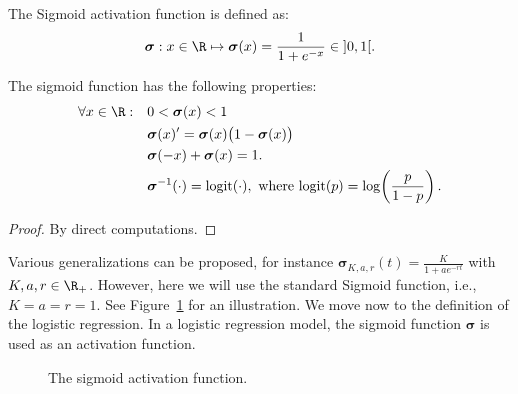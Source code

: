 \begin{definition}
The Sigmoid activation function is defined as:
\begin{equation}\label{eq:ch4-sigmoid-def}
\boldsymbol{\sigma} : x \in \R \mapsto \boldsymbol{\sigma}(x) = \frac{1}{1 + e^{-x}} \in\; ]0, 1[.
\end{equation}
\end{definition}

\begin{lemma}
The sigmoid function has the following properties:
\begin{align}
\forall x \in \R:\quad & 0 < \boldsymbol{\sigma}(x) < 1 \label{eq:ch4-sig-bounds}\\
& \boldsymbol{\sigma}(x)' = \boldsymbol{\sigma}(x)\bigl(1 - \boldsymbol{\sigma}(x)\bigr) \label{eq:ch4-sig-deriv}\\
& \boldsymbol{\sigma}(-x) + \boldsymbol{\sigma}(x) = 1. \label{eq:ch4-sig-sym}\\
& \boldsymbol{\sigma}^{-1}(\cdot) = \mathrm{logit}(\cdot),\ \text{where } \mathrm{logit}(p) = \log\!\left( \frac{p}{1-p} \right). \label{eq:ch4-sig-logit}
\end{align}
\end{lemma}
\begin{proof}
By direct computations.
\end{proof}

Various generalizations can be proposed, for instance $\boldsymbol{\sigma}_{K,a,r}(t) = \frac{K}{1 + a e^{-rt}}$
with $K, a, r \in \R_+$. However, here we will use the standard Sigmoid function,
i.e., $K = a = r = 1$. See Figure~\ref{fig:ch4-sigmoid} for an illustration.
We move now to the definition of the logistic regression. In a logistic
regression model, the sigmoid function $\boldsymbol{\sigma}$ is used as an activation function.

\begin{figure}[h]\centering
\caption{The sigmoid activation function.}\label{fig:ch4-sigmoid}
\end{figure}


